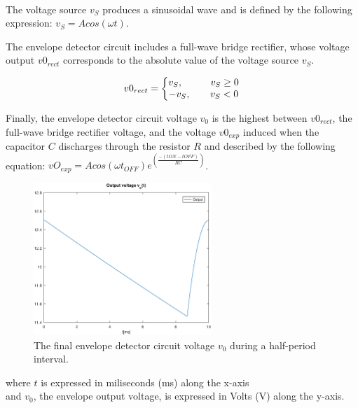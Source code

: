 \paragraph{}
The voltage source $v_S$ produces a sinusoidal wave and is defined by the following expression: $v_S=Acos(\omega t)$.

The envelope detector circuit includes a full-wave bridge rectifier, whose voltage output $v0_{rect}$ corresponds to the absolute value of the voltage source $v_S$.

\[
v0_{rect} =
\left\{\begin{matrix}
v_S, \hspace{1cm} v_S \ge 0\\
-v_S,\hspace{0.7cm} v_S < 0\\
\end{matrix}\right.
\]

Finally, the envelope detector circuit voltage $v_0$ is the highest between $v0_{rect}$, the full-wave bridge rectifier voltage, and the voltage $v0_{exp}$ induced when the capacitor $C$ discharges through the resistor $R$ and described by the following equation: $vO_{exp}=Acos(\omega t_{OFF})e^(\frac{-({tON}-{tOFF})}{RC})$.


\begin{figure}[H] \centering
\includegraphics[width=0.6\textwidth]{envelope.eps}
\caption{The final envelope detector circuit voltage $v_0$ during a half-period interval.}
\label{fig:envelope}
\end{figure}

where $t$ is expressed in miliseconds (ms) along the x-axis\\
and $v_0$, the envelope output voltage, is expressed in Volts (V) along the y-axis.

